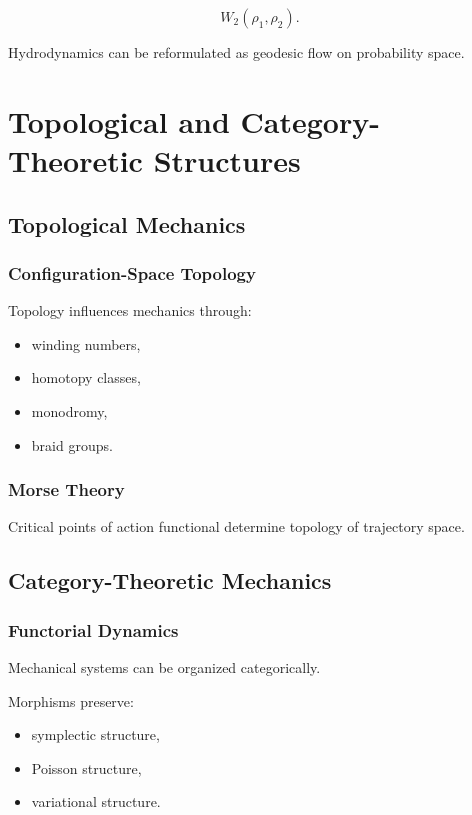 \documentclass[11pt]{book}
\begin{document}
\[
W_2(\rho_1,\rho_2).
\]

Hydrodynamics can be reformulated as geodesic flow on probability space.

\part{Topological and Category-Theoretic Structures}

\chapter{Topological Mechanics}

\section{Configuration-Space Topology}

Topology influences mechanics through:

\begin{itemize}
\item winding numbers,
\item homotopy classes,
\item monodromy,
\item braid groups.
\end{itemize}

\section{Morse Theory}

Critical points of action functional determine topology of trajectory space.

\chapter{Category-Theoretic Mechanics}

\section{Functorial Dynamics}

Mechanical systems can be organized categorically.

Morphisms preserve:

\begin{itemize}
\item symplectic structure,
\item Poisson structure,
\item variational structure.
\end{itemize}
\end{document}
